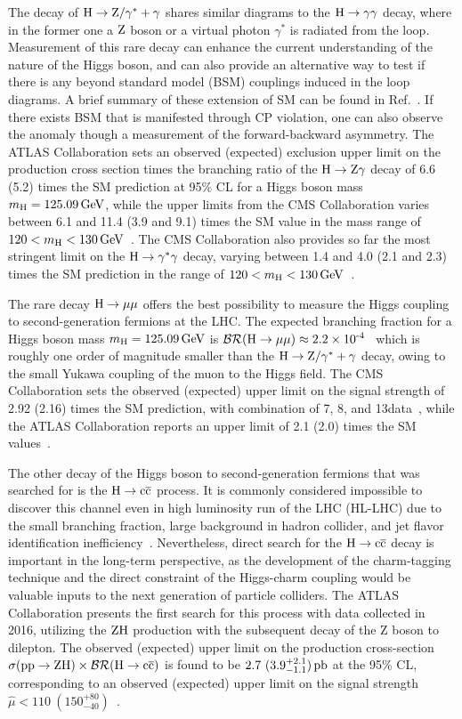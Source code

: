 The decay of $\mathrm{H}\to\mathrm{Z}/\gamma^{*}+\gamma$ shares similar diagrams to the $\mathrm{H}\to\gamma\gamma$ decay, where in the former one a $\mathrm{Z}$ boson or a virtual photon $\gamma^{*}$ is radiated from the loop. Measurement of this rare decay can enhance the current understanding of the nature of the Higgs boson, and can also provide an alternative way to test if there is any beyond standard model (BSM) couplings induced in the loop diagrams. A brief summary of these extension of SM can be found in Ref.~\cite{Sirunyan:2018tbk,Aaboud:2017uhw}. If there exists BSM that is manifested through CP violation, one can also observe the anomaly though a measurement of the forward-backward asymmetry. The ATLAS Collaboration sets an observed (expected) exclusion upper limit on the production cross section times the branching ratio of the $\mathrm{H}\to\mathrm{Z}\gamma$ decay of 6.6 (5.2) times the SM prediction at 95\% CL for a Higgs boson mass $m_{\mathrm{H}}=125.09\,\text{Ge\hspace{-.08em}V}$, while the upper limits from the CMS Collaboration varies between 6.1 and 11.4 (3.9 and 9.1) times the SM value in the mass range of $120<m_{\mathrm{H}}<130\,\text{Ge\hspace{-.08em}V}$~\cite{Sirunyan:2018tbk,Aaboud:2017uhw}. The CMS Collaboration also provides so far the most stringent limit on the $\mathrm{H}\to\gamma^{*}\gamma$ decay, varying between 1.4 and 4.0 (2.1 and 2.3) times the SM prediction in the range of $120<m_{\mathrm{H}}<130\,\text{Ge\hspace{-.08em}V}$~\cite{Sirunyan:2018tbk}.

The rare decay $\mathrm{H}\to\mu\mu$ offers the best possibility to measure the Higgs coupling to second-generation fermions at the LHC. The expected branching fraction for a Higgs boson mass $m_{\mathrm{H}}=125.09\,\text{Ge\hspace{-.08em}V}$ is $\mathcal{BR}(\mathrm{H}\to\mu\mu)\approx 2.2\times \text{10}^\text{-4}$~\cite{deFlorian:2016spz} which is roughly one order of magnitude smaller than the $\mathrm{H}\to\mathrm{Z}/\gamma^{*}+\gamma$ decay, owing to the small Yukawa coupling of the muon to the Higgs field. The CMS Collaboration sets the observed (expected) upper limit on the signal strength of 2.92 (2.16) times the SM prediction, with combination of 7, 8, and 13\TeV data~\cite{Sirunyan:2018hbu}, while the ATLAS Collaboration reports an upper limit of 2.1 (2.0) times the SM values~\cite{ATLAS-CONF-2018-026}.

The other decay of the Higgs boson to second-generation fermions that was searched for is the $\mathrm{H}\to\mathrm{c}\overline{\mathrm{c}}$ process. It is commonly considered impossible to discover this channel even in high luminosity run of the LHC (HL-LHC) due to the small branching fraction, large background in hadron collider, and jet flavor identification inefficiency~\cite{Perez:2015aoa,Perez:2015lra}. Nevertheless, direct search for the $\mathrm{H}\to\mathrm{c}\overline{\mathrm{c}}$ decay is important in the long-term perspective, as the development of the charm-tagging technique and the direct constraint of the Higgs-charm coupling would be valuable inputs to the next generation of particle colliders. The ATLAS Collaboration presents the first search for this process with data collected in 2016, utilizing the $\mathrm{Z}\mathrm{H}$ production with the subsequent decay of the Z boson to dilepton. The observed (expected) upper limit on the production cross-section $\sigma(\mathrm{p}\mathrm{p}\to\mathrm{Z}\mathrm{H})\times\mathcal{BR}(\mathrm{H}\to\mathrm{c}\overline{\mathrm{c}})$ is found to be $2.7\ (3.9^{+2.1}_{-1.1})\pb$ at the 95\% CL, corresponding to an observed (expected) upper limit on  the signal strength $\hat{\mu}<110\ (150^{+80}_{-40})$~\cite{Aaboud:2018fhh}.

